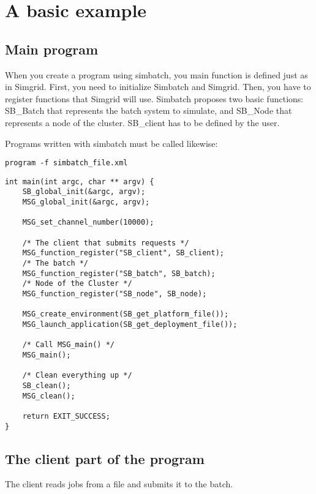 \section{A basic example}

\subsection{Main program}

When you create a program using simbatch, you main function is defined
just as in Simgrid. First, you need to initialize Simbatch and
Simgrid. Then, you have to register functions that Simgrid will
use. Simbatch proposes two basic functions: SB\_Batch that represents
the batch system to simulate, and SB\_Node that represents a node of
the cluster. SB\_client has to be defined by the user.

Programs written with simbatch must be called likewise:
\begin{verbatim}
program -f simbatch_file.xml
\end{verbatim}

{\small
\begin{verbatim}
int main(int argc, char ** argv) {
    SB_global_init(&argc, argv);
    MSG_global_init(&argc, argv);
 
    MSG_set_channel_number(10000);
    
    /* The client that submits requests */
    MSG_function_register("SB_client", SB_client);
    /* The batch */
    MSG_function_register("SB_batch", SB_batch);
    /* Node of the Cluster */
    MSG_function_register("SB_node", SB_node);
    
    MSG_create_environment(SB_get_platform_file());
    MSG_launch_application(SB_get_deployment_file());
    
    /* Call MSG_main() */
    MSG_main();
    
    /* Clean everything up */
    SB_clean();
    MSG_clean();

    return EXIT_SUCCESS;
}
\end{verbatim}
}

\subsection{The client part of the program}

The client reads jobs from a file and submits it to the batch. 


